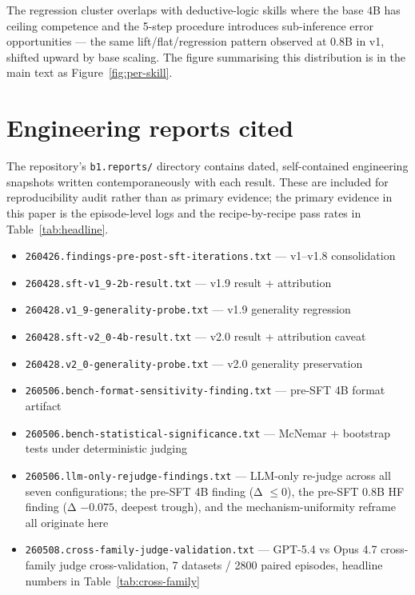 \documentclass[10pt]{article}
\begin{document}
The regression cluster overlaps with deductive-logic skills where the base 4B has ceiling competence and the 5-step procedure introduces sub-inference error opportunities --- the same lift/flat/regression pattern observed at 0.8B in v1, shifted upward by base scaling. The figure summarising this distribution is in the main text as Figure~\ref{fig:per-skill}.

\section{Engineering reports cited}\label{app:reports}
The repository's \texttt{b1.reports/} directory contains dated, self-contained engineering snapshots written contemporaneously with each result. These are included for reproducibility audit rather than as primary evidence; the primary evidence in this paper is the episode-level logs and the recipe-by-recipe pass rates in Table~\ref{tab:headline}.
\begin{itemize}[leftmargin=*,nosep]
  \item \texttt{260426.findings-pre-post-sft-iterations.txt} --- v1--v1.8 consolidation
  \item \texttt{260428.sft-v1\_9-2b-result.txt} --- v1.9 result + attribution
  \item \texttt{260428.v1\_9-generality-probe.txt} --- v1.9 generality regression
  \item \texttt{260428.sft-v2\_0-4b-result.txt} --- v2.0 result + attribution caveat
  \item \texttt{260428.v2\_0-generality-probe.txt} --- v2.0 generality preservation
  \item \texttt{260506.bench-format-sensitivity-finding.txt} --- pre-SFT 4B format artifact
  \item \texttt{260506.bench-statistical-significance.txt} --- McNemar + bootstrap tests under deterministic judging
  \item \texttt{260506.llm-only-rejudge-findings.txt} --- LLM-only re-judge across all seven configurations; the pre-SFT 4B finding (Δ $\leq 0$), the pre-SFT 0.8B HF finding (Δ $-0.075$, deepest trough), and the mechanism-uniformity reframe all originate here
  \item \texttt{260508.cross-family-judge-validation.txt} --- GPT-5.4 vs Opus 4.7 cross-family judge cross-validation, 7 datasets / 2800 paired episodes, headline numbers in Table~\ref{tab:cross-family}
\end{itemize}
\end{document}
